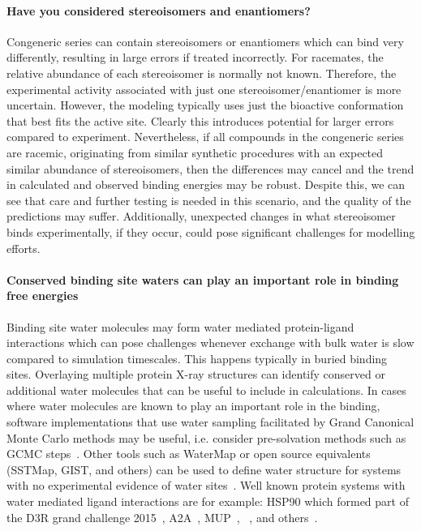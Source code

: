 \documentclass[9pt,bestpractices]{livecoms}
\begin{document}
\paragraph{Have you considered stereoisomers and enantiomers?}
Congeneric series can contain stereoisomers or enantiomers which can bind very differently, resulting in large errors if treated incorrectly. For racemates, the relative abundance of each stereoisomer is normally not known. Therefore, the experimental activity associated with just one stereoisomer/enantiomer is more uncertain. However, the modeling typically uses just the bioactive conformation that best fits the active site. Clearly this introduces potential for larger errors compared to experiment. Nevertheless, if all compounds in the congeneric series are racemic, originating from similar synthetic procedures with an expected similar abundance of stereoisomers, then the differences may cancel and the trend in calculated and observed binding energies may be robust. Despite this, we can see that care and further testing is needed in this scenario, and the quality of the predictions may suffer. Additionally, unexpected changes in what stereoisomer binds experimentally, if they occur, could pose significant challenges for modelling efforts.

\paragraph{Conserved binding site waters can play an important role in binding free energies}
Binding site water molecules may form water mediated protein-ligand interactions which can pose challenges whenever exchange with bulk water is slow compared to simulation timescales. This happens typically in buried binding sites. Overlaying multiple protein X-ray structures can identify conserved or additional water molecules that can be useful to include in calculations. In cases where water molecules are known to play an important role in the binding, software implementations that use water sampling facilitated by Grand Canonical Monte Carlo methods may be useful, i.e. consider pre-solvation methods such as GCMC steps~\cite{michel2010prediction}. Other tools such as WaterMap or open source equivalents (SSTMap, GIST, and others) can be used to define water structure for systems with no experimental evidence of water sites~\cite{wang2011ligand}. Well known protein systems with water mediated ligand interactions are for example: HSP90 which formed part of the D3R grand challenge 2015~\cite{mey2016blinded}, A2A~\cite{brucemacdonald2018ligand}, MUP~\cite{ross2015water}, ~\cite{deflorian2020accurate}, and others~\cite{michel2009energetics}.
\end{document}
